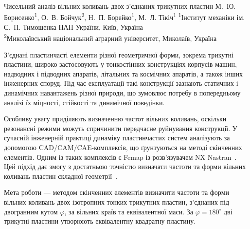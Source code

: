 \ReportHeading
  {Чисельний аналіз вільних коливань двох з’єднаних трикутних пластин}
  {М.~Ю. Борисенко\textsuperscript{1}, О.~В. Бойчук\textsuperscript{2}, Н.~П. Борейко\textsuperscript{1}, М.~Л. Тікіч\textsuperscript{1}}
  {\textsuperscript{1}Інститут механіки ім. С.~П. Тимошенка НАН України, Київ, Україна\\
   \textsuperscript{2}Миколаївський національний аграрний університет, Миколаїв, Україна}
  {}

З’єднані пластинчасті елементи різної геометричної форми, зокрема трикутні пластини, широко застосовують у тонкостінних конструкціях корпусів машин, надводних і підводних апаратів, літальних та космічних апаратів, а також інших інженерних споруд. Під час експлуатації такі конструкції зазнають статичних і динамічних навантажень різної природи, що зумовлює потребу в попередньому аналізі їх міцності, стійкості та динамічної поведінки.

Особливу увагу приділяють визначенню частот вільних коливань, оскільки резонансні режими можуть спричинити передчасне руйнування конструкції. У сучасній інженерній практиці динаміку пластинчастих систем аналізують за допомогою CAD/CAM/CAE-комплексів, що ґрунтуються на методі скінченних елементів. Одним із таких комплексів є Femap із розв’язувачем NX Nastran~\cite{plates:femap}. Цей підхід дає змогу з достатньою точністю визначати частоти та форми вільних коливань пластин складної геометрії~\cite{plates:hexagonal,plates:triangular}.

Мета роботи --- методом скінченних елементів визначити частоти та форми вільних коливань двох ізотропних тонких трикутних пластин, з’єднаних під двогранним кутом $\varphi$, за вільних країв та еквівалентної маси. За $\varphi=180^{\circ}$ дві трикутні пластини утворюють еквівалентну квадратну пластину.

